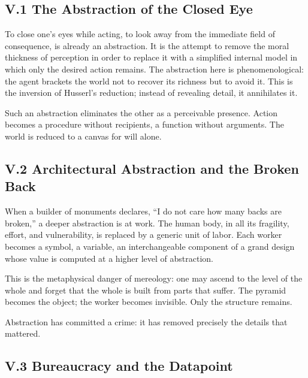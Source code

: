 \documentclass[11pt,letterpaper]{article}
\begin{document}
\subsection{V.1 The Abstraction of the Closed Eye}

To close one’s eyes while acting, to look away from the immediate field of consequence, is already an abstraction. It is the attempt to remove the moral thickness of perception in order to replace it with a simplified internal model in which only the desired action remains. The abstraction here is phenomenological: the agent brackets the world not to recover its richness but to avoid it. This is the inversion of Husserl’s reduction; instead of revealing detail, it annihilates it.

Such an abstraction eliminates the other as a perceivable presence. Action becomes a procedure without recipients, a function without arguments. The world is reduced to a canvas for will alone.

\subsection{V.2 Architectural Abstraction and the Broken Back}

When a builder of monuments declares, ``I do not care how many backs are broken,'' a deeper abstraction is at work. The human body, in all its fragility, effort, and vulnerability, is replaced by a generic unit of labor. Each worker becomes a symbol, a variable, an interchangeable component of a grand design whose value is computed at a higher level of abstraction.

This is the metaphysical danger of mereology: one may ascend to the level of the whole and forget that the whole is built from parts that suffer. The pyramid becomes the object; the worker becomes invisible. Only the structure remains.

Abstraction has committed a crime: it has removed precisely the details that mattered.

\subsection{V.3 Bureaucracy and the Datapoint}
\end{document}
